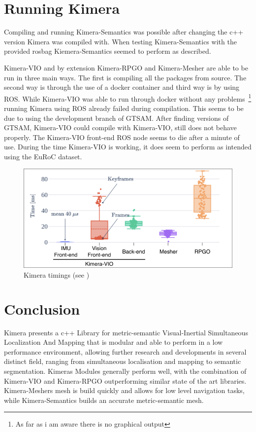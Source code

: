 \documentclass[11pt,a4paper]{article}
\begin{document}
\section{Running Kimera}
Compiling and running Kimera-Semantics was possible after changing the c++ version Kimera was compiled with.
When testing Kimera-Semantics with the provided rosbag Kiemera-Semantics seemed to perform as described.

Kimera-VIO and by extension Kimera-RPGO and Kimera-Mesher are able to be run in three main ways. 
The first is compiling all the packages from source. 
The second way is through the use of a docker container and third way is by using ROS.
While Kimera-VIO was able to run through docker without any problems~\footnote{As far as i am aware there is no graphical output} running Kimera using ROS already failed during compilation. 
This seems to be due to using the development branch of GTSAM. 
After finding versions of GTSAM, Kimera-VIO could compile with Kimera-VIO, still does not behave properly. 
The Kimera-VIO front-end ROS node seems to die after a minute of use.
During the time Kimera-VIO is working, it does seem to perform as intended using the EuRoC dataset.
\begin{figure}
  \centering
  \includegraphics[width=120mm]{Timings}
  \caption{Kimera timings (see \cite{rosinol2020kimera})}\label{Fig:Timings}  
\end{figure}

\section{Conclusion}
Kimera presents a c++ Library for metric-semantic Visual-Inertial Simultaneous Localization And Mapping that is modular and able to perform in a low performance environment, allowing further research and developments in several distinct field, ranging from simultaneous localisation and mapping to semantic segmentation.
Kimeras Modules generally perform well, with the combination of Kimera-VIO and Kimera-RPGO outperforming similar state of the art libraries.
Kimera-Meshers mesh is build quickly and allows for low level navigation tasks, while Kimera-Semantics builds an accurate metric-semantic mesh.


{\small                   %

}
\end{document}
